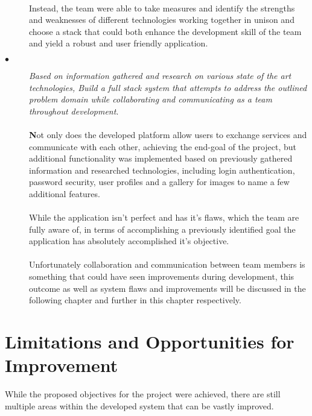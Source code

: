 \begin{description}
  \paragraph{}
  Instead, the team were able to take measures and identify the strengths and weaknesses of different technologies working together in unison and choose a stack that could both enhance the development skill of the team and yield a robust and user friendly application.
  
  \item[$\bullet$] \textit{Based on information gathered and research on various state of the art technologies, Build a full stack system that attempts to address the outlined problem domain while collaborating and communicating as a team throughout development}. 

  \paragraph{}
  \textbf{N}ot only does the developed platform allow users to exchange services and communicate with each other, achieving the end-goal of the project, but additional functionality was implemented based on previously gathered information and researched technologies, including login authentication, password security, user profiles and a gallery for images to name a few additional features.
  
  \paragraph{}
  While the application isn't perfect and has it's flaws, which the team are fully aware of, in terms of accomplishing a previously identified goal the application has absolutely accomplished it's objective. 
  
  \paragraph{}
  Unfortunately collaboration and communication between team members is something that could have seen improvements during development, this outcome as well as system flaws and improvements will be discussed in the following chapter and further in this chapter respectively.
\end{description}

\section{Limitations and Opportunities for Improvement}
While the proposed objectives for the project were achieved, there are still multiple areas within the developed system that can be vastly improved.


